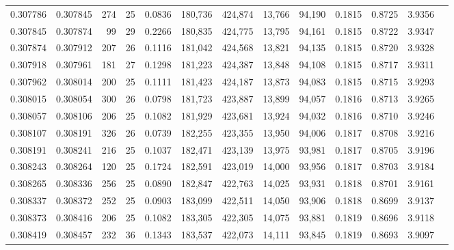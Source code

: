 \begin{tabular}{rrrrrrrrrrrrr}
0.307786 & 0.307845 &   274 &  25 &                                     0.0836 & 180,736 & 424,874 &  13,766 &  94,190 & 0.1815 & 0.8725 & 3.9356 \\
0.307845 & 0.307874 &    99 &  29 &                                     0.2266 & 180,835 & 424,775 &  13,795 &  94,161 & 0.1815 & 0.8722 & 3.9347 \\
0.307874 & 0.307912 &   207 &  26 &                                     0.1116 & 181,042 & 424,568 &  13,821 &  94,135 & 0.1815 & 0.8720 & 3.9328 \\
0.307918 & 0.307961 &   181 &  27 &                                     0.1298 & 181,223 & 424,387 &  13,848 &  94,108 & 0.1815 & 0.8717 & 3.9311 \\
0.307962 & 0.308014 &   200 &  25 &                                     0.1111 & 181,423 & 424,187 &  13,873 &  94,083 & 0.1815 & 0.8715 & 3.9293 \\
0.308015 & 0.308054 &   300 &  26 &                                     0.0798 & 181,723 & 423,887 &  13,899 &  94,057 & 0.1816 & 0.8713 & 3.9265 \\
0.308057 & 0.308106 &   206 &  25 &                                     0.1082 & 181,929 & 423,681 &  13,924 &  94,032 & 0.1816 & 0.8710 & 3.9246 \\
0.308107 & 0.308191 &   326 &  26 &                                     0.0739 & 182,255 & 423,355 &  13,950 &  94,006 & 0.1817 & 0.8708 & 3.9216 \\
0.308191 & 0.308241 &   216 &  25 &                                     0.1037 & 182,471 & 423,139 &  13,975 &  93,981 & 0.1817 & 0.8705 & 3.9196 \\
0.308243 & 0.308264 &   120 &  25 &                                     0.1724 & 182,591 & 423,019 &  14,000 &  93,956 & 0.1817 & 0.8703 & 3.9184 \\
0.308265 & 0.308336 &   256 &  25 &                                     0.0890 & 182,847 & 422,763 &  14,025 &  93,931 & 0.1818 & 0.8701 & 3.9161 \\
0.308337 & 0.308372 &   252 &  25 &                                     0.0903 & 183,099 & 422,511 &  14,050 &  93,906 & 0.1818 & 0.8699 & 3.9137 \\
0.308373 & 0.308416 &   206 &  25 &                                     0.1082 & 183,305 & 422,305 &  14,075 &  93,881 & 0.1819 & 0.8696 & 3.9118 \\
0.308419 & 0.308457 &   232 &  36 &                                     0.1343 & 183,537 & 422,073 &  14,111 &  93,845 & 0.1819 & 0.8693 & 3.9097 \\

\end{tabular}
